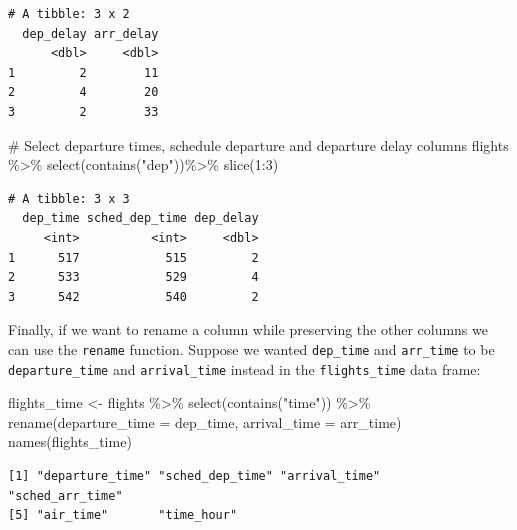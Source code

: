 \documentclass[
  letterpaper,
  DIV=11,
  numbers=noendperiod]{scrartcl}
\newenvironment{Shaded}{\begin{snugshade}}{\end{snugshade}}
\newcommand{\AttributeTok}[1]{\textcolor[rgb]{0.40,0.45,0.13}{#1}}
\newcommand{\CommentTok}[1]{\textcolor[rgb]{0.37,0.37,0.37}{#1}}
\newcommand{\DecValTok}[1]{\textcolor[rgb]{0.68,0.00,0.00}{#1}}
\newcommand{\FunctionTok}[1]{\textcolor[rgb]{0.28,0.35,0.67}{#1}}
\newcommand{\NormalTok}[1]{\textcolor[rgb]{0.00,0.23,0.31}{#1}}
\newcommand{\OtherTok}[1]{\textcolor[rgb]{0.00,0.23,0.31}{#1}}
\newcommand{\SpecialCharTok}[1]{\textcolor[rgb]{0.37,0.37,0.37}{#1}}
\newcommand{\StringTok}[1]{\textcolor[rgb]{0.13,0.47,0.30}{#1}}
\begin{document}
\begin{tcolorbox}
\begin{verbatim}
# A tibble: 3 x 2
  dep_delay arr_delay
      <dbl>     <dbl>
1         2        11
2         4        20
3         2        33
\end{verbatim}

\begin{Shaded}
\begin{Highlighting}[]
\CommentTok{\# Select departure times, schedule departure and departure delay columns}
\NormalTok{flights }\SpecialCharTok{\%\textgreater{}\%}
  \FunctionTok{select}\NormalTok{(}\FunctionTok{contains}\NormalTok{(}\StringTok{"dep"}\NormalTok{))}\SpecialCharTok{\%\textgreater{}\%}
  \FunctionTok{slice}\NormalTok{(}\DecValTok{1}\SpecialCharTok{:}\DecValTok{3}\NormalTok{)}
\end{Highlighting}
\end{Shaded}

\begin{verbatim}
# A tibble: 3 x 3
  dep_time sched_dep_time dep_delay
     <int>          <int>     <dbl>
1      517            515         2
2      533            529         4
3      542            540         2
\end{verbatim}

\end{tcolorbox}

Finally, if we want to rename a column while preserving the other
columns we can use the \texttt{rename} function. Suppose we wanted
\texttt{dep\_time} and \texttt{arr\_time} to be \texttt{departure\_time}
and \texttt{arrival\_time} instead in the \texttt{flights\_time} data
frame:

\begin{Shaded}
\begin{Highlighting}[]
\NormalTok{flights\_time }\OtherTok{\textless{}{-}}\NormalTok{ flights }\SpecialCharTok{\%\textgreater{}\%}
  \FunctionTok{select}\NormalTok{(}\FunctionTok{contains}\NormalTok{(}\StringTok{"time"}\NormalTok{)) }\SpecialCharTok{\%\textgreater{}\%}
  \FunctionTok{rename}\NormalTok{(}\AttributeTok{departure\_time =}\NormalTok{ dep\_time, }\AttributeTok{arrival\_time =}\NormalTok{ arr\_time)}
\FunctionTok{names}\NormalTok{(flights\_time)}
\end{Highlighting}
\end{Shaded}

\begin{verbatim}
[1] "departure_time" "sched_dep_time" "arrival_time"   "sched_arr_time"
[5] "air_time"       "time_hour"     
\end{verbatim}
\end{document}
